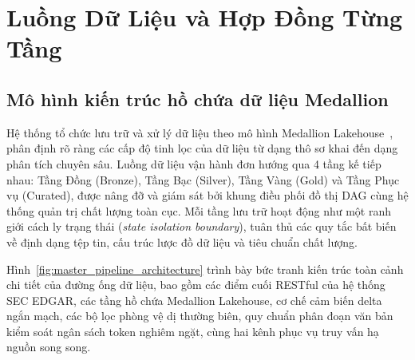 \section{Luồng Dữ Liệu và Hợp Đồng Từng Tầng}

\subsection{Mô hình kiến trúc hồ chứa dữ liệu Medallion}
Hệ thống tổ chức lưu trữ và xử lý dữ liệu theo mô hình Medallion Lakehouse~\cite{armbrust2021lakehouse}, phân định rõ ràng các cấp độ tinh lọc của dữ liệu từ dạng thô sơ khai đến dạng phân tích chuyên sâu. Luồng dữ liệu vận hành đơn hướng qua 4 tầng kế tiếp nhau: Tầng Đồng (Bronze), Tầng Bạc (Silver), Tầng Vàng (Gold) và Tầng Phục vụ (Curated), được nâng đỡ và giám sát bởi khung điều phối đồ thị DAG cùng hệ thống quản trị chất lượng toàn cục. Mỗi tầng lưu trữ hoạt động như một ranh giới cách ly trạng thái (\textit{state isolation boundary}), tuân thủ các quy tắc bất biến về định dạng tệp tin, cấu trúc lược đồ dữ liệu và tiêu chuẩn chất lượng.

Hình~\ref{fig:master_pipeline_architecture} trình bày bức tranh kiến trúc toàn cảnh chi tiết của đường ống dữ liệu, bao gồm các điểm cuối RESTful của hệ thống SEC EDGAR, các tầng hồ chứa Medallion Lakehouse, cơ chế cảm biến delta ngắn mạch, các bộ lọc phòng vệ dị thường biên, quy chuẩn phân đoạn văn bản kiểm soát ngân sách token nghiêm ngặt, cùng hai kênh phục vụ truy vấn hạ nguồn song song.

